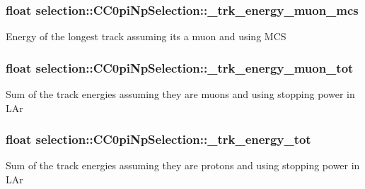 \subsubsection[{\texorpdfstring{\+\_\+trk\+\_\+energy\+\_\+muon\+\_\+mcs}{_trk_energy_muon_mcs}}]{\setlength{\rightskip}{0pt plus 5cm}float selection\+::\+C\+C0pi\+Np\+Selection\+::\+\_\+trk\+\_\+energy\+\_\+muon\+\_\+mcs\hspace{0.3cm}{\ttfamily [private]}}\hypertarget{classselection_1_1CC0piNpSelection_a4ae8946bcc37ce152c81ba3c28d60fbb}{}\label{classselection_1_1CC0piNpSelection_a4ae8946bcc37ce152c81ba3c28d60fbb}
Energy of the longest track assuming it\textquotesingle{}s a muon and using M\+CS 
\subsubsection[{\texorpdfstring{\+\_\+trk\+\_\+energy\+\_\+muon\+\_\+tot}{_trk_energy_muon_tot}}]{\setlength{\rightskip}{0pt plus 5cm}float selection\+::\+C\+C0pi\+Np\+Selection\+::\+\_\+trk\+\_\+energy\+\_\+muon\+\_\+tot\hspace{0.3cm}{\ttfamily [private]}}\hypertarget{classselection_1_1CC0piNpSelection_aebac9c09110d469f5d7ed3817c33e437}{}\label{classselection_1_1CC0piNpSelection_aebac9c09110d469f5d7ed3817c33e437}
Sum of the track energies assuming they are muons and using stopping power in L\+Ar 
\subsubsection[{\texorpdfstring{\+\_\+trk\+\_\+energy\+\_\+tot}{_trk_energy_tot}}]{\setlength{\rightskip}{0pt plus 5cm}float selection\+::\+C\+C0pi\+Np\+Selection\+::\+\_\+trk\+\_\+energy\+\_\+tot\hspace{0.3cm}{\ttfamily [private]}}\hypertarget{classselection_1_1CC0piNpSelection_a8a0da0081e2f182880249debba6551e3}{}\label{classselection_1_1CC0piNpSelection_a8a0da0081e2f182880249debba6551e3}
Sum of the track energies assuming they are protons and using stopping power in L\+Ar 
